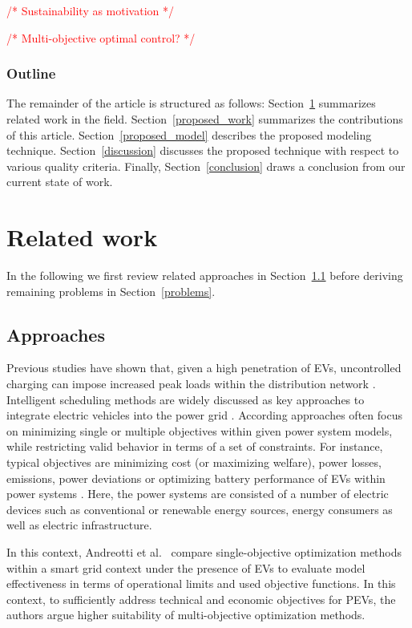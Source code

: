 \documentclass[conference]{IEEEtran}
\newcommand{\todo}[1]{\textcolor{red}{/* #1 */}}
\begin{document}
	\todo{Sustainability as motivation}
	
	\todo{Multi-objective optimal control?}
	
	\subsubsection*{Outline}
	
	The remainder of the article is structured as follows: Section~\ref{related_work} summarizes related work in the field. Section~\ref{proposed_work} summarizes the contributions of this article. Section~\ref{proposed_model} describes the proposed modeling technique. Section~\ref{discussion} discusses the proposed technique with respect to various quality criteria. Finally, Section~\ref{conclusion} draws a conclusion from our current state of work.
	
	\section{Related work}
	\label{related_work}
	
	In the following we first review related approaches in Section~\ref{approaches} before deriving remaining problems in Section~\ref{problems}.
	
	\subsection{Approaches}
	\label{approaches}
		
	Previous studies have shown that, given a high penetration of EVs, uncontrolled charging can impose increased peak loads within the distribution network \cite{lopes2009identifying}. Intelligent scheduling methods are widely discussed as key approaches to integrate electric vehicles into the power grid \cite{yang2015computational}. According approaches often focus on minimizing single or multiple objectives within given power system models, while restricting valid behavior in terms of a set of constraints. For instance, typical objectives are minimizing cost (or maximizing welfare), power losses, emissions, power deviations or optimizing battery performance of EVs within power systems \cite{yang2015computational}. Here, the power systems are consisted of a number of electric devices such as conventional or renewable energy sources, energy consumers as well as electric infrastructure.
	
	In this context, Andreotti et al.~\cite{andreotti2012review} compare single-objective optimization methods within a smart grid context under the presence of EVs to evaluate model effectiveness in terms of operational limits and used objective functions. In this context, to sufficiently address technical and economic objectives for PEVs, the authors argue higher suitability of multi-objective optimization methods. 
	
\end{document}
